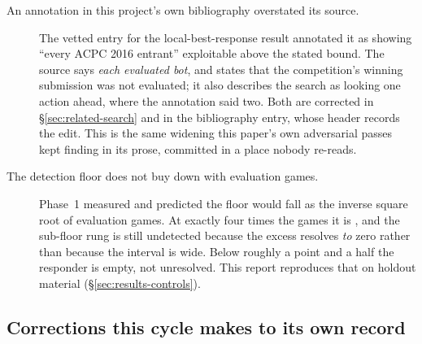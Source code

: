 \begin{description}
\item[An annotation in this project's own bibliography overstated its source.] The vetted entry for
  the local-best-response result annotated it as showing ``every ACPC 2016 entrant'' exploitable
  above the stated bound. The source says \emph{each evaluated bot}, and states that the
  competition's winning submission was not evaluated; it also describes the search as looking one
  action ahead, where the annotation said two. Both are corrected in
  \S\ref{sec:related-search} and in the bibliography entry, whose header records the edit. This is
  the same widening this paper's own adversarial passes kept finding in its prose, committed in a
  place nobody re-reads.

\item[The detection floor does not buy down with evaluation games.] Phase~1 measured
  \vsevenFloorPhaseOne{} and predicted the floor would fall as the inverse square root of evaluation
  games. At exactly four times the games it is \vsevenPrimaryFloor{}, and the sub-floor rung is still
  undetected because the excess resolves \emph{to} zero rather than because the interval is wide. Below
  roughly a point and a half the responder is empty, not unresolved. This report reproduces that on
  holdout material (\S\ref{sec:results-controls}).

\end{description}

\subsection{Corrections this cycle makes to its own record}
\label{app:corrections-self}


